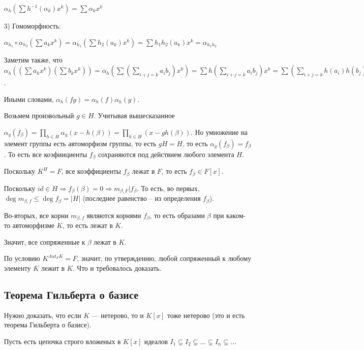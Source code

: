 \documentclass[../main.tex]{subfiles}
\begin{document}
    $\alpha_h(\sum h^{-1}(\alpha_k) x^k) = \sum \alpha_kx^k$

    3) Гомоморфность:

    $\alpha_{h_1} \circ \alpha_{h_2}(\sum a_k x^k)
    = \alpha_{h_1}(\sum h_2(a_k) x^k) = \sum h_1 h_2 (a_k) x^k
    = \alpha_{h_1 h_2}$

    Заметим также, что $\alpha_h((\sum a_k x^k)(\sum b_kx^k))
    = \alpha_h(\sum (\sum\limits_{i + j = k} a_ib_j)x^k)
    = \sum h(\sum\limits_{i + j = k} a_ib_j)x^k
    = \sum (\sum\limits_{i + j = k} h(a_i)h(b_j)) x^k
    = (\sum h(a_k)x^k)(\sum h(b_k)x^k)
    = \alpha_h(\sum a_kx^k)\alpha_h(\sum b_kx^k)$.

    Иными словами, $\alpha_h(fg) = \alpha_h(f)\alpha_h(g)$.

    Возьмем произвольный $g \in H$. Учитывая вышесказанное

    $\alpha_g(f_\beta) = \prod\limits_{h \in H} \alpha_g(x - h(\beta))
    =  \prod\limits_{h \in H} (x - gh(\beta))$. Но умножение на элемент
    группы есть автоморфизм группы, то есть $gH = H$, то есть
    $\alpha_g(f_\beta) = f_\beta$. То есть все коэфиициенты $f_\beta$
    сохраняются под действием любого элемента $H$.

    Поскольку $K^H = F$, все
    коэффициенты $f_\beta$ лежат в $F$, то есть $f_\beta \in F[x]$.

    Поскольку  $id \in H \Rightarrow f_\beta(\beta) = 0 \Rightarrow
    m_{\beta, F} | f_\beta$. То есть, во первых, $\deg m_{\beta, f} \leqslant
    \deg f_\beta = |H|$ (последнее равенство -- из определения $f_\beta$).

    Во-вторых, все корни $m_{\beta, f}$ являются корнями $f_\beta$, то есть
    образами $\beta$ при каком-то автоморфизме $K$, то есть лежат в $K$.

    Значит, все сопряженные к $\beta$ лежат в $K$.

    По условию $K^{Aut_FK} = F$, значит, по утверждению, любой сопряженный к
    любому элементу $K$ лежит в $K$. Что и требовалось доказать.



\hypertarget{9.2}{\subsection{Теорема Гильберта о базисе}}

    Нужно доказать, что если $K$ --- нетерово, то и $K[x]$ тоже нетерово
    (это и есть теорема Гильберта о базисе).

    Пусть есть цепочка строго вложеных в $K[x]$ идеалов
    $I_1 \subsetneq I_2 \subsetneq \ldots  \subsetneq I_n \subsetneq \ldots$
\end{document}
